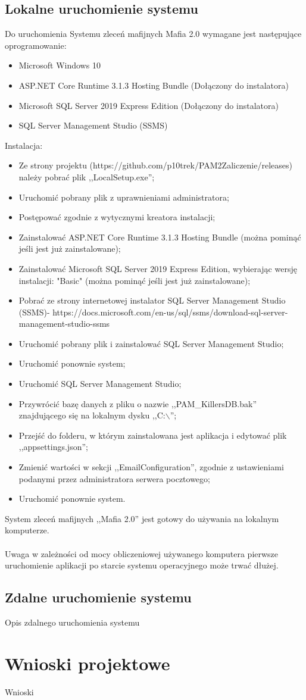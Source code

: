\documentclass[12pt,a4paper]{article}
\begin{document}
		\subsection{Lokalne uruchomienie systemu}
			Do uruchomienia Systemu zleceń mafijnych Mafia 2.0 wymagane jest następujące oprogramowanie:
			\begin{itemize}
				\item Microsoft Windows 10
				\item ASP.NET Core Runtime 3.1.3 Hosting Bundle (Dołączony do instalatora)
				\item Microsoft SQL Server 2019 Express Edition (Dołączony do instalatora)
				\item SQL Server Management Studio (SSMS)
			\end{itemize}
			Instalacja:
			\begin{itemize}
				\item Ze strony projektu (https://github.com/p10trek/PAM2Zaliczenie/releases) należy pobrać plik ,,LocalSetup.exe'';
				\item Uruchomić pobrany plik z uprawnieniami administratora;
				\item Postępować zgodnie z wytycznymi kreatora instalacji;
				\item Zainstalować ASP.NET Core Runtime 3.1.3 Hosting Bundle (można pominąć jeśli jest już zainstalowane);
				\item Zainstalować Microsoft SQL Server 2019 Express Edition, wybierając wersję instalacji: "Basic" (można pominąć jeśli jest już zainstalowane);
				\item Pobrać ze strony internetowej instalator SQL Server Management Studio (SSMS)- https://docs.microsoft.com/en-us/sql/ssms/download-sql-server-management-studio-ssms
				\item Uruchomić pobrany plik i zainstalować SQL Server Management Studio;
				\item Uruchomić ponownie system;
				\item Uruchomić SQL Server Management Studio;
				\item Przywrócić bazę danych z pliku o nazwie ,,PAM\_KillersDB.bak'' znajdującego się na lokalnym dysku ,,C:$\backslash$'';
				\item Przejść do folderu, w którym zainstalowana jest aplikacja i edytować plik ,,appsettings.json'';
				\item Zmienić wartości w sekcji ,,EmailConfiguration'', zgodnie z ustawieniami podanymi przez administratora serwera pocztowego;
				\item Uruchomić ponownie system.
			\end{itemize}
			System zleceń mafijnych ,,Mafia 2.0'' jest gotowy do używania na lokalnym komputerze.\\\\Uwaga w zależności od mocy obliczeniowej używanego komputera pierwsze uruchomienie aplikacji 				po starcie systemu operacyjnego może trwać dłużej.		
		\subsection{Zdalne uruchomienie systemu}
			Opis zdalnego uruchomienia systemu
	
	\section{Wnioski projektowe}
		Wnioski
\end{document}
